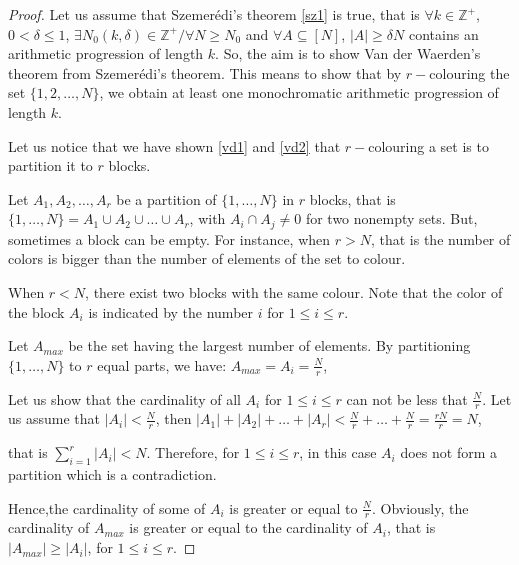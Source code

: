 \begin{proof}
  Let us assume that Szemerédi's theorem \eqref{sz1} is true, that is $\forall k \in \mathbb{Z}^+$, $0< \delta \leq  1$, $\exists N_0(k,\delta) \in \mathbb{Z}^+/ \forall N \geq N_0$ and $ \forall A \subseteq [N]$, $|A|\geq \delta N$ contains an arithmetic progression of length $k.$ So, the aim is to show  Van der Waerden's theorem from Szemerédi's theorem. This means to  show that by $r-$colouring the set $\{1,2,\ldots, N\}$, we obtain at least one monochromatic arithmetic progression of length $k.$
  
   Let us notice that we have shown \eqref{vd1} and \eqref{vd2} that $r-$colouring a set  is to partition it to $r$ blocks.

  Let $A_1,A_2, \ldots, A_r$ be a partition of $\{1, \ldots, N\}$ in $r$ blocks, that is $ \{1, \ldots, N\} =A_1 \cup A_2 \cup \ldots \cup A_r$, with $A_i \cap A_j \neq 0$ for two nonempty sets. But, sometimes a block can be empty. For instance, when $r >N$, that is the number of colors is bigger than the number of elements of the set to colour.
  
When $r <N$, there exist two blocks with the same colour. Note that the color of the block $A_i$ is indicated  by the number $i$  for $1\leq i \leq r.$ 

  Let $A_{max}$ be the set having the largest number of elements. By partitioning $\{1, \ldots, N\}$ to $r$ equal parts, we have: $A_{max}=A_i=\frac{N}{r}$,

Let us show that the cardinality of all $A_i$  for $1\leq i \leq r$ can not be less that $\frac{N}{r}$. Let us assume that  $|A_i| < \frac{N}{r}$,  then $|A_1|+|A_2|+ \ldots +|A_r| < \frac{N}{r}+\ldots +\frac{N}{r}=\frac{rN}{r}=N$,

 that is $\displaystyle{ \sum_{i=1}^{r}|A_i|<N}$. Therefore, for $1\leq i \leq r$, in this case $A_i$ does not form a partition which is a contradiction.

Hence,the cardinality of some of $A_i$ is greater or equal to  $\frac{N}{r}.$
%
Obviously, the cardinality of $A_{max}$ is greater or equal to the cardinality of $A_i$, that is $|A_{max}| \geq |A_i|$, for $1\leq i \leq r.$


\end{proof}

